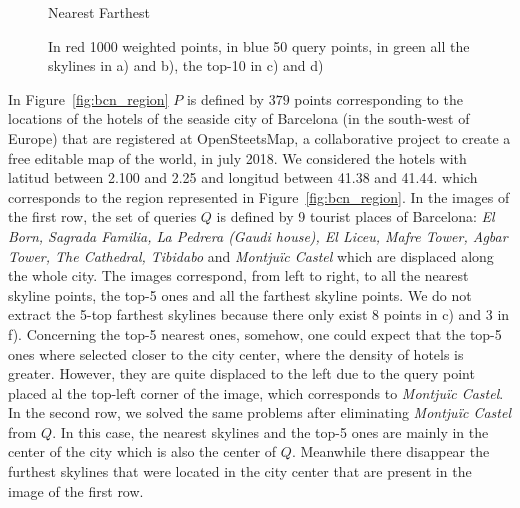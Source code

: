 \documentclass[11pt,onecolumn]{elsart3p}
\begin{document}
\begin{figure}[]
\begin{center}
            Nearest \hspace{0.33\linewidth}  Farthest
          \caption{In red 1000 weighted points, in blue 50 query points, in green all the skylines in a) and b), the top-10 in c) and d)
          }\label{fig:w_Images}
        \end{center}
     \end{figure}

  In Figure~\ref{fig:bcn_region} $P$ is defined by $379$ points corresponding to the locations of the hotels of the seaside city of Barcelona (in the south-west of Europe) that are registered at OpenSteetsMap, a collaborative project to create a free editable map of the world, \cite{OpenStreetMap} in july 2018. We considered the hotels with latitud between 2.100 and 2.25 and longitud between 41.38 and 41.44.  In the images of the first row, the set of queries $Q$ is defined by 9 tourist places of Barcelona: {\it El Born, Sagrada Familia, La Pedrera (Gaudi house), El Liceu, Mafre Tower, Agbar Tower, The Cathedral, Tibidabo} and {\it Montju\"ic Castel} which are displaced along the whole city. The images correspond, from left to right, to all the nearest skyline points, the top-5 ones and all the farthest skyline points. We do not extract the 5-top farthest skylines because there only exist 8 points in c) and 3 in f). Concerning the top-5 nearest ones, somehow, one could expect that the top-5 ones where selected closer to the city center, where the density of hotels is greater. However, they are quite displaced to the left due to the query point placed al the top-left corner of the image, which corresponds to {\it Montju\"ic Castel}. In the second row, we solved the same problems after eliminating  {\it Montju\"ic Castel} from $Q$. In this case, the nearest skylines and the top-5 ones are mainly in the center of the city which is also the center of $Q$. Meanwhile there disappear the furthest skylines that were located in the city center that are present in the image of the first row. %
\end{document}
